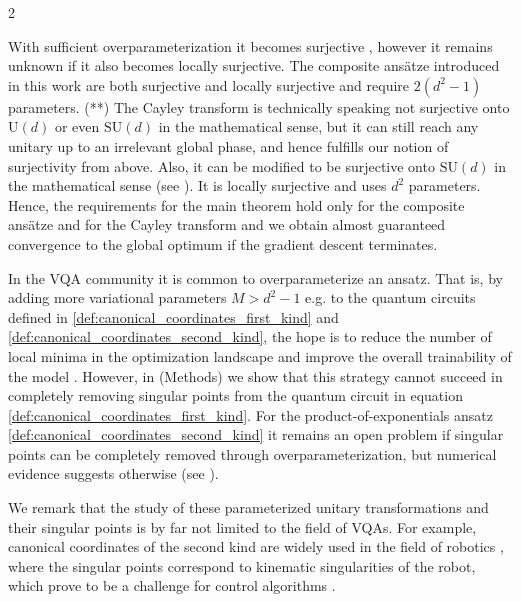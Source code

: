 \documentclass{article}
\begin{document}
\begin{multicols}{2}
\begin{table}
{    With sufficient overparameterization it becomes surjective \cite{dalessandro_uniform_2021}, however it remains unknown if it also becomes locally surjective. The composite ansätze  introduced in this work are both surjective and locally surjective and require \(2(d^2-1)\) parameters. (**) The Cayley transform is technically speaking not surjective onto \(\mathrm{U}(d)\) or even \(\mathrm{SU}(d)\) in the mathematical sense, but it can still reach any unitary up to an irrelevant global phase, and hence fulfills our notion of surjectivity from above. Also, it can be modified to be surjective onto \(\mathrm{SU}(d)\) in the mathematical sense (see ). It is locally surjective and uses \(d^2\) parameters. Hence, the requirements for the main theorem hold only for the composite ansätze and for the Cayley transform and we obtain almost guaranteed convergence to the global optimum if the gradient descent terminates.}
    \label{tab:ansätze}
\end{table}

In the \gls{VQA} community it is common to overparameterize an ansatz. That is, by adding more variational parameters $M>d^{2}-1$ e.g. to the quantum circuits defined in \eqref{def:canonical_coordinates_first_kind} and \eqref{def:canonical_coordinates_second_kind}, the hope is to reduce the number of local minima in the optimization landscape and improve the overall trainability of the model \cite{larocca_theory_2023}.
However, in  (Methods) we show that this strategy cannot succeed in completely removing singular points from the quantum circuit in equation \eqref{def:canonical_coordinates_first_kind}.
For the product-of-exponentials ansatz \eqref{def:canonical_coordinates_second_kind} it remains an open problem if singular points can be completely removed through overparameterization, but numerical evidence suggests otherwise (see ).

We remark that the study of these parameterized unitary transformations and their singular points is by far not limited to the field of \glspl{VQA}.
For example, canonical coordinates of the second kind are widely used in the field of robotics \cite{brockett_robotic_1984}, where the singular points correspond to kinematic singularities of the robot, which prove to be a challenge for control algorithms \cite{donelan_kinematic_2010}.


\end{multicols}
\end{document}
